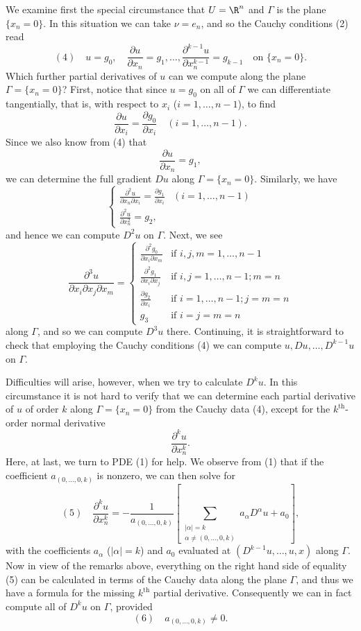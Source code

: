 We examine first the special circumstance that $U = \R^n$ and $\Gamma$ is the plane $\{x_n = 0\}$. In this situation we can take $\nu = e_n$, and so the Cauchy conditions (2) read
$$(4) \quad u = g_0, \quad \frac{\partial u}{\partial x_n} = g_1, \ldots, \frac{\partial^{k-1} u}{\partial x_n^{k-1}} = g_{k-1} \quad \text{on } \{x_n = 0\}.$$
Which further partial derivatives of $u$ can we compute along the plane $\Gamma = \{x_n = 0\}$? First, notice that since $u = g_0$ on all of $\Gamma$ we can differentiate tangentially, that is, with respect to $x_i$ ($i = 1, \ldots, n-1$), to find
$$\frac{\partial u}{\partial x_i} = \frac{\partial g_0}{\partial x_i} \quad (i = 1, \ldots, n-1).$$
Since we also know from (4) that
$$\frac{\partial u}{\partial x_n} = g_1,$$
we can determine the full gradient $Du$ along $\Gamma = \{x_n = 0\}$. Similarly, we have
$$\begin{cases} \frac{\partial^2 u}{\partial x_n \partial x_i} = \frac{\partial g_1}{\partial x_i} & (i = 1, \ldots, n-1) \\ \frac{\partial^2 u}{\partial x_n^2} = g_2, \end{cases}$$
and hence we can compute $D^2u$ on $\Gamma$. Next, we see
$$\frac{\partial^3 u}{\partial x_i \partial x_j \partial x_m} = \begin{cases}
\frac{\partial^2 g_0}{\partial x_i \partial x_m} & \text{if } i,j,m = 1,\ldots,n-1 \\
\frac{\partial^2 g_1}{\partial x_i \partial x_j} & \text{if } i,j = 1,\ldots,n-1; m = n \\
\frac{\partial g_2}{\partial x_i} & \text{if } i = 1,\ldots,n-1; j = m = n \\
g_3 & \text{if } i = j = m = n
\end{cases}$$
along $\Gamma$, and so we can compute $D^3u$ there. Continuing, it is straightforward to check that employing the Cauchy conditions (4) we can compute $u, Du, \ldots, D^{k-1}u$ on $\Gamma$.

Difficulties will arise, however, when we try to calculate $D^ku$. In this circumstance it is not hard to verify that we can determine each partial derivative of $u$ of order $k$ along $\Gamma = \{x_n = 0\}$ from the Cauchy data (4), except for the $k^{\text{th}}$-order normal derivative
$$\frac{\partial^k u}{\partial x_n^k}.$$
Here, at last, we turn to PDE (1) for help. We observe from (1) that if the coefficient $a_{(0,\ldots,0,k)}$ is nonzero, we can then solve for
$$(5) \quad \frac{\partial^k u}{\partial x_n^k} = -\frac{1}{a_{(0,\ldots,0,k)}} \left[ \sum_{\substack{|\alpha|=k \\ \alpha \neq (0,\ldots,0,k)}} a_\alpha D^\alpha u + a_0 \right],$$
with the coefficients $a_\alpha$ ($|\alpha| = k$) and $a_0$ evaluated at $(D^{k-1}u, \ldots, u, x)$ along $\Gamma$. Now in view of the remarks above, everything on the right hand side of equality (5) can be calculated in terms of the Cauchy data along the plane $\Gamma$, and thus we have a formula for the missing $k^{\text{th}}$ partial derivative. Consequently we can in fact compute all of $D^k u$ on $\Gamma$, provided
$$(6) \quad a_{(0,\ldots,0,k)} \neq 0.$$


